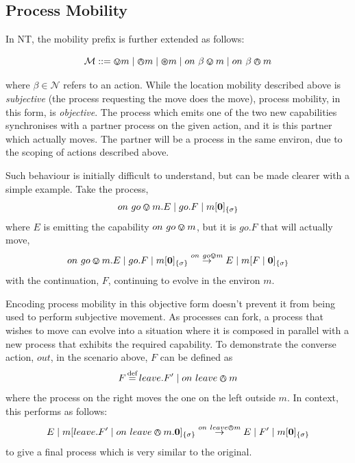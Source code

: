\subsection{Process Mobility}
\label{procmob}

In NT, the mobility prefix is further extended as follows:

\begin{equation}
   \text{$\mathcal{M}$} \mathrel{::=} \varovee m \mid \varowedge m \mid \varoast m 
      \mid on\ \beta \varovee m \mid on\ \beta \varowedge m
\end{equation}

\noindent where $\beta \in \mathcal{N}$ refers to an action.  While
the location mobility described above is \emph{subjective} (the
process requesting the move does the move), process mobility, in this
form, is \emph{objective}.  The process which emits one of the two new
capabilities synchronises with a partner process on the given action,
and it is this partner which actually moves.  The partner will be a
process in the same environ, due to the scoping of actions described
above.

Such behaviour is initially difficult to understand, but can be made
clearer with a simple example.  Take the process,
\begin{equation}
on\ go \varovee m.E \;|\; go.F \;|\; {m}[ \textbf{0} ]_{\{\sigma\}}
\end{equation}
\noindent where $E$ is emitting the capability $on\ go \varovee m$, but it
is $go.F$ that will actually move,
\begin{equation}
on\ go \varovee m.E \;|\; go.F \;|\; {m}[ \textbf{0} ]_{\{\sigma\}} \stackrel{on\ go \varovee m}{\rightarrow}
E \;|\; {m}[ F \;|\; \textbf{0} ]_{\{\sigma\}}
\end{equation}
with the continuation, $F$, continuing to evolve in the environ $m$.   

Encoding process mobility in this objective form doesn't prevent it from
being used to perform subjective movement.  As processes can fork, a
process that wishes to move can evolve into a situation where it is
composed in parallel with a new process that exhibits the required
capability.  To demonstrate the converse action, $out$, in the scenario
above, $F$ can be defined as
\begin{equation}
F \operatorname{\stackrel{\textrm{def}}{=}} leave.F^\prime \;|\; on\ leave \varowedge m
\end{equation}
where the process on the right moves the one on the left outside $m$.
In context, this performs as follows:
\begin{equation}
E \;|\; {m}[ leave.F^\prime \;|\; on\ leave \varowedge m.\textbf{0} ]_{\{\sigma\}} 
\stackrel{on\ leave \varowedge m}{\rightarrow}
E \;|\; F^\prime \;|\; {m}[ \textbf{0} ]_{\{\sigma\}}
\end{equation}
to give a final process which is very similar to the original.

